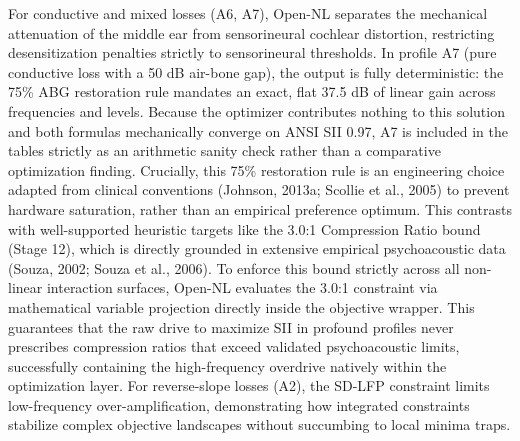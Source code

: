 \documentclass[
  12pt,
]{article}
\begin{document}
For conductive and mixed losses (A6, A7), Open-NL separates the
mechanical attenuation of the middle ear from sensorineural cochlear
distortion, restricting desensitization penalties strictly to
sensorineural thresholds. In profile A7 (pure conductive loss with a 50
dB air-bone gap), the output is fully deterministic: the 75\% ABG
restoration rule mandates an exact, flat 37.5 dB of linear gain across
frequencies and levels. Because the optimizer contributes nothing to
this solution and both formulas mechanically converge on ANSI SII 0.97,
A7 is included in the tables strictly as an arithmetic sanity check
rather than a comparative optimization finding. Crucially, this 75\%
restoration rule is an engineering choice adapted from clinical
conventions (Johnson, 2013a; Scollie et al., 2005) to prevent hardware
saturation, rather than an empirical preference optimum. This contrasts
with well-supported heuristic targets like the 3.0:1 Compression Ratio
bound (Stage 12), which is directly grounded in extensive empirical
psychoacoustic data (Souza, 2002; Souza et al., 2006). To enforce this
bound strictly across all non-linear interaction surfaces, Open-NL
evaluates the 3.0:1 constraint via mathematical variable projection
directly inside the objective wrapper. This guarantees that the raw
drive to maximize SII in profound profiles never prescribes compression
ratios that exceed validated psychoacoustic limits, successfully
containing the high-frequency overdrive natively within the optimization
layer. For reverse-slope losses (A2), the SD-LFP constraint limits
low-frequency over-amplification, demonstrating how integrated
constraints stabilize complex objective landscapes without succumbing to
local minima traps.
\end{document}
